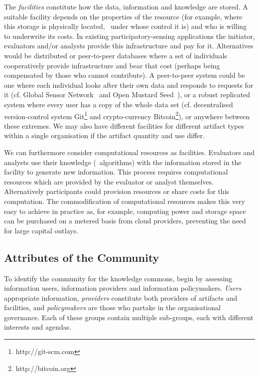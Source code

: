 The \emph{facilities} constitute how the data, information and knowledge are
stored. A suitable facility depends on the properties of the resource (for
example, where this storage is physically located, \ie\ under whose control it
is) and who is willing to underwrite its costs.  In existing 
participatory-sensing applications the initiator, evaluators and/or analysts provide this
infrastructure and pay for it. Alternatives would be distributed or peer-to-peer 
databases where a set of individuals cooperatively provide infrastructure
and bear that cost (perhaps being compensated by those who cannot contribute).
A peer-to-peer system could be one where each individual looks after their own
data and responds to requests for it (cf. Global Sensor
Network~\citep{Aberer2006} and Open Mustard Seed~\citep{Hardjono2014}), or a
robust replicated system where every user has a copy of the whole data set
(cf. decentralised version-control system Git\footnote{http://git-scm.com} and
crypto-currency Bitcoin\footnote{http://bitcoin.org}), or anywhere between
these extremes.  We may also have different facilities for different artifact
types within a single organisation if the artifact quantity and use
differ.

We can furthermore consider computational resources as facilities. Evaluators
and analysts use their knowledge (\ie\ algorithms) with the information stored
in the facility to generate new information. This process requires
computational resources which are provided by the evaluator or analyst
themselves. Alternatively participants could provision resources or share
costs for this computation. The commodification of computational resources
makes this very easy to achieve in practice as, for example, computing power
and storage space can be purchased on a metered basis from cloud providers,
preventing the need for large capital outlays.

\subsection{Attributes of the Community}

To identify the community for the knowledge commons,  begin by assessing information users, information providers and information policymakers. 
\emph{Users} appropriate information, \emph{providers} constitute both providers of artifacts and facilities, and \emph{policymakers} are those who partake in the organisational governance. 
Each of these groups contain multiple sub-groups, each with different interests and agendas.

